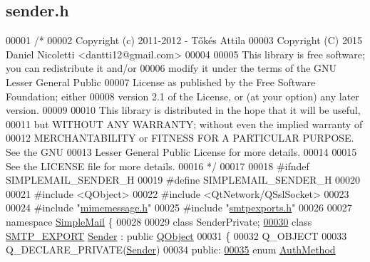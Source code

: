 \hypertarget{sender_8h_source}{}\subsection{sender.\+h}
\label{sender_8h_source}

\begin{DoxyCode}
00001 \textcolor{comment}{/*}
00002 \textcolor{comment}{  Copyright (c) 2011-2012 - Tőkés Attila}
00003 \textcolor{comment}{  Copyright (C) 2015 Daniel Nicoletti <dantti12@gmail.com>}
00004 \textcolor{comment}{}
00005 \textcolor{comment}{  This library is free software; you can redistribute it and/or}
00006 \textcolor{comment}{  modify it under the terms of the GNU Lesser General Public}
00007 \textcolor{comment}{  License as published by the Free Software Foundation; either}
00008 \textcolor{comment}{  version 2.1 of the License, or (at your option) any later version.}
00009 \textcolor{comment}{}
00010 \textcolor{comment}{  This library is distributed in the hope that it will be useful,}
00011 \textcolor{comment}{  but WITHOUT ANY WARRANTY; without even the implied warranty of}
00012 \textcolor{comment}{  MERCHANTABILITY or FITNESS FOR A PARTICULAR PURPOSE.  See the GNU}
00013 \textcolor{comment}{  Lesser General Public License for more details.}
00014 \textcolor{comment}{}
00015 \textcolor{comment}{  See the LICENSE file for more details.}
00016 \textcolor{comment}{*/}
00017 
00018 \textcolor{preprocessor}{#ifndef SIMPLEMAIL\_SENDER\_H}
00019 \textcolor{preprocessor}{#define SIMPLEMAIL\_SENDER\_H}
00020 
00021 \textcolor{preprocessor}{#include <QObject>}
00022 \textcolor{preprocessor}{#include <QtNetwork/QSslSocket>}
00023 
00024 \textcolor{preprocessor}{#include "\hyperlink{mimemessage_8h}{mimemessage.h}"}
00025 \textcolor{preprocessor}{#include "\hyperlink{smtpexports_8h}{smtpexports.h}"}
00026 
00027 \textcolor{keyword}{namespace }\hyperlink{namespace_simple_mail}{SimpleMail} \{
00028 
00029 \textcolor{keyword}{class }SenderPrivate;
\hyperlink{class_simple_mail_1_1_sender}{00030} \textcolor{keyword}{class }\hyperlink{smtpexports_8h_ac580c9660cb24a34b13807f4eb0e1bd0}{SMTP\_EXPORT} \hyperlink{class_simple_mail_1_1_sender}{Sender} : \textcolor{keyword}{public} \hyperlink{class_q_object}{QObject}
00031 \{
00032     Q\_OBJECT
00033     Q\_DECLARE\_PRIVATE(\hyperlink{class_simple_mail_1_1_sender}{Sender})
00034 \textcolor{keyword}{public}:
\hyperlink{class_simple_mail_1_1_sender_af50defb714bc3e95f47c71a9ba6ee6bb}{00035}     \textcolor{keyword}{enum} \hyperlink{class_simple_mail_1_1_sender_af50defb714bc3e95f47c71a9ba6ee6bb}{AuthMethod}

\end{DoxyCode}
